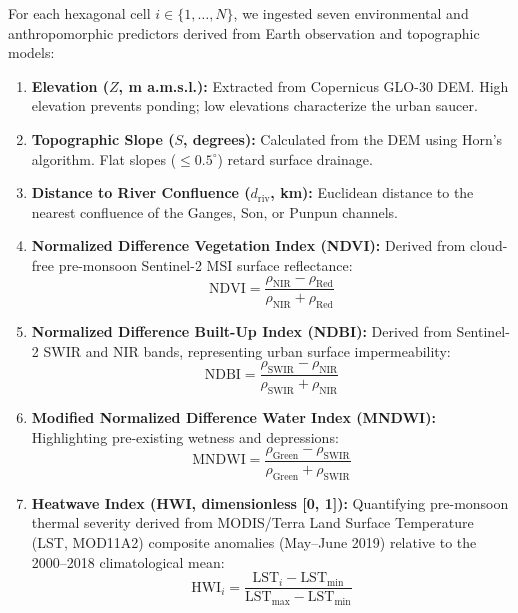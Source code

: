 \documentclass[OA,linenum]{InterPore}
\begin{document}
For each hexagonal cell $i \in \{1, \dots, N\}$, we ingested seven environmental and anthropomorphic predictors derived from Earth observation and topographic models:
\begin{enumerate}
    \item \textbf{Elevation ($Z$, m a.m.s.l.):} Extracted from Copernicus GLO-30 DEM. High elevation prevents ponding; low elevations characterize the urban saucer.
    \item \textbf{Topographic Slope ($S$, degrees):} Calculated from the DEM using Horn's algorithm. Flat slopes ($\le 0.5^\circ$) retard surface drainage.
    \item \textbf{Distance to River Confluence ($d_{\text{riv}}$, km):} Euclidean distance to the nearest confluence of the Ganges, Son, or Punpun channels.
    \item \textbf{Normalized Difference Vegetation Index (NDVI):} Derived from cloud-free pre-monsoon Sentinel-2 MSI surface reflectance:
    \begin{equation}
        \text{NDVI} = \frac{\rho_{\text{NIR}} - \rho_{\text{Red}}}{\rho_{\text{NIR}} + \rho_{\text{Red}}}
    \end{equation}
    \item \textbf{Normalized Difference Built-Up Index (NDBI):} Derived from Sentinel-2 SWIR and NIR bands, representing urban surface impermeability:
    \begin{equation}
        \text{NDBI} = \frac{\rho_{\text{SWIR}} - \rho_{\text{NIR}}}{\rho_{\text{SWIR}} + \rho_{\text{NIR}}}
    \end{equation}
    \item \textbf{Modified Normalized Difference Water Index (MNDWI):} Highlighting pre-existing wetness and depressions:
    \begin{equation}
        \text{MNDWI} = \frac{\rho_{\text{Green}} - \rho_{\text{SWIR}}}{\rho_{\text{Green}} + \rho_{\text{SWIR}}}
    \end{equation}
    \item \textbf{Heatwave Index (HWI, dimensionless [0, 1]):} Quantifying pre-monsoon thermal severity derived from MODIS/Terra Land Surface Temperature (LST, MOD11A2) composite anomalies (May--June 2019) relative to the 2000--2018 climatological mean:
    \begin{equation}
        \text{HWI}_i = \frac{\text{LST}_i - \text{LST}_{\min}}{\text{LST}_{\max} - \text{LST}_{\min}}
    \end{equation}
\end{enumerate}
\end{document}
